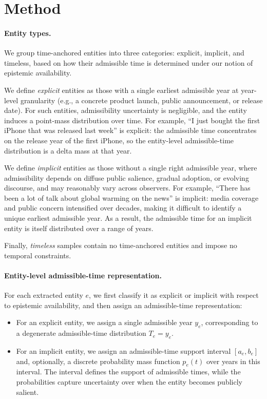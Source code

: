 \section{Method}

\paragraph{Entity types.}
We group time-anchored entities into three categories: explicit, implicit, and timeless, based on how their admissible time is determined under our notion of epistemic availability.

We define \emph{explicit} entities as those with a single earliest admissible year at year-level granularity (e.g., a concrete product launch, public announcement, or release date). For such entities, admissibility uncertainty is negligible, and the entity induces a point-mass distribution over time. For example, ``I just bought the first iPhone that was released last week'' is explicit: the admissible time concentrates on the release year of the first iPhone, so the entity-level admissible-time distribution is a delta mass at that year.

We define \emph{implicit} entities as those without a single right admissible year, where admissibility depends on diffuse public salience, gradual adoption, or evolving discourse, and may reasonably vary across observers. For example, ``There has been a lot of talk about global warming on the news'' is implicit: media coverage and public concern intensified over decades, making it difficult to identify a unique earliest admissible year. As a result, the admissible time for an implicit entity is itself distributed over a range of years.

Finally, \emph{timeless} samples contain no time-anchored entities and impose no temporal constraints.

\paragraph{Entity-level admissible-time representation.}
For each extracted entity $e$, we first classify it as explicit or implicit with respect to epistemic availability, and then assign an admissible-time representation:

\begin{itemize}
    \item For an explicit entity, we assign a single admissible year $y_e$, corresponding to a degenerate admissible-time distribution $T_e = y_e$.
    \item For an implicit entity, we assign an admissible-time support interval $[a_e, b_e]$ and, optionally, a discrete probability mass function $p_e(t)$ over years in this interval. The interval defines the support of admissible times, while the probabilities capture uncertainty over when the entity becomes publicly salient.
\end{itemize}

